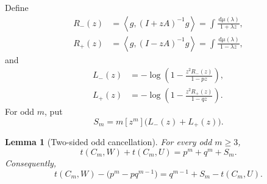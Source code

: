 \documentclass[11pt]{article}
\newtheorem{lemma}[theorem]{Lemma}
\newcommand{\ip}[2]{\left\langle #1,#2\right\rangle}
\newcommand{\dd}{\,\mathrm d}
\begin{document}
Define
\begin{align}
 R_-(z)&=\ip g{(I+zA)^{-1}g}
       =\int\frac{\dd\mu(\lambda)}{1+\lambda z},\label{eq:dense-Rminus}\\
 R_+(z)&=\ip g{(I-zA)^{-1}g}
       =\int\frac{\dd\mu(\lambda)}{1-\lambda z},\label{eq:dense-Rplus}
\end{align}
and
\begin{align}
 L_-(z)&=-\log\left(1-\frac{z^2R_-(z)}{1-pz}\right),\label{eq:dense-Lminus}\\
 L_+(z)&=-\log\left(1-\frac{z^2R_+(z)}{1-qz}\right).\label{eq:dense-Lplus}
\end{align}
For odd \(m\), put
\begin{equation}\label{eq:dense-Sm}
       S_m=m[z^m]\bigl(L_-(z)+L_+(z)\bigr).
\end{equation}

\begin{lemma}[Two-sided odd cancellation]\label{lem:dense-cancellation}
For every odd \(m\ge3\),
\begin{equation}\label{eq:dense-cycle-sum}
       t(C_m,W)+t(C_m,U)=p^m+q^m+S_m.
\end{equation}
Consequently,
\begin{equation}\label{eq:dense-defect}
 t(C_m,W)-\bigl(p^m-pq^{m-1}\bigr)
 =q^{m-1}+S_m-t(C_m,U).
\end{equation}
\end{lemma}
\end{document}

